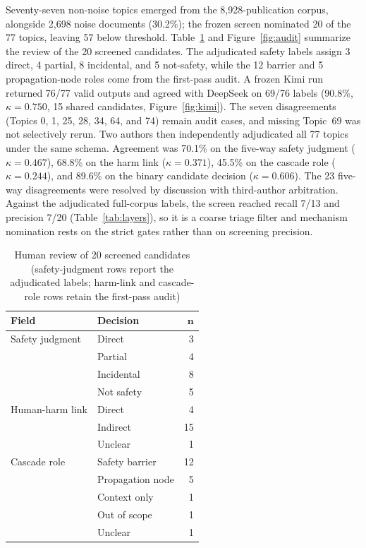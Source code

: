 \documentclass[letterpaper,9pt,conference]{ieeeconf}
\begin{document}
Seventy-seven non-noise topics emerged from the 8,928-publication corpus, alongside 2,698 noise documents (30.2\%); the frozen screen nominated 20 of the 77 topics, leaving 57 below threshold. Table~\ref{tab:review} and Figure~\ref{fig:audit} summarize the review of the 20 screened candidates. The adjudicated safety labels assign 3 direct, 4 partial, 8 incidental, and 5 not-safety, while the 12 barrier and 5 propagation-node roles come from the first-pass audit. A frozen Kimi run returned 76/77 valid outputs and agreed with DeepSeek on 69/76 labels (90.8\%, $\kappa = 0.750$, 15 shared candidates, Figure~\ref{fig:kimi}). The seven disagreements (Topics 0, 1, 25, 28, 34, 64, and 74) remain audit cases, and missing Topic~69 was not selectively rerun. Two authors then independently adjudicated all 77 topics under the same schema. Agreement was 70.1\% on the five-way safety judgment ($\kappa = 0.467$), 68.8\% on the harm link ($\kappa = 0.371$), 45.5\% on the cascade role ($\kappa = 0.244$), and 89.6\% on the binary candidate decision ($\kappa = 0.606$). The 23 five-way disagreements were resolved by discussion with third-author arbitration. Against the adjudicated full-corpus labels, the screen reached recall 7/13 and precision 7/20 (Table~\ref{tab:layers}), so it is a coarse triage filter and mechanism nomination rests on the strict gates rather than on screening precision.



\begin{table}[!t]
\centering
\caption{Human review of 20 screened candidates (safety-judgment rows report the adjudicated labels; harm-link and cascade-role rows retain the first-pass audit)}
\label{tab:review}
\footnotesize
\renewcommand{\arraystretch}{0.92}
\begin{tabularx}{\columnwidth}{@{}>{\raggedright\arraybackslash}X >{\raggedright\arraybackslash}X r@{}}
\toprule
\textbf{Field} & \textbf{Decision} & $\mathbf{n}$ \\
\midrule
Safety judgment & Direct & 3 \\
& Partial & 4 \\
& Incidental & 8 \\
& Not safety & 5 \\
\addlinespace
Human-harm link & Direct & 4 \\
& Indirect & 15 \\
& Unclear & 1 \\
\addlinespace
Cascade role & Safety barrier & 12 \\
& Propagation node & 5 \\
& Context only & 1 \\
& Out of scope & 1 \\
& Unclear & 1 \\
\bottomrule
\end{tabularx}
\end{table}
\end{document}
